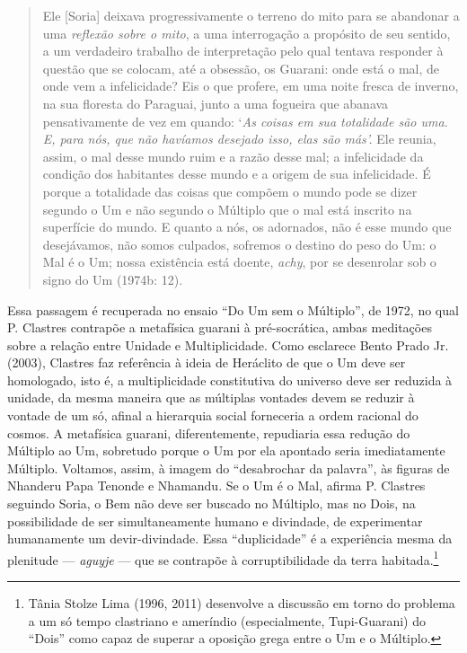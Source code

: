 \begin{quote}
Ele {[}Soria{]} deixava progressivamente o terreno do mito para se
abandonar a uma \emph{reflexão sobre o mito}, a uma interrogação a
propósito de seu sentido, a um verdadeiro trabalho de interpretação pelo
qual tentava responder à questão que se colocam, até a obsessão, os
Guarani: onde está o mal, de onde vem a infelicidade? Eis o que profere,
em uma noite fresca de inverno, na sua floresta do Paraguai, junto a uma
fogueira que abanava pensativamente de vez em quando: `\emph{As coisas
em sua totalidade são uma. E, para nós, que não havíamos desejado isso,
elas são más'.} Ele reunia, assim, o mal desse mundo ruim e a razão
desse mal; a infelicidade da condição dos habitantes desse mundo e a
origem de sua infelicidade. É porque a totalidade das coisas que compõem
o mundo pode se dizer segundo o Um e não segundo o Múltiplo que o mal
está inscrito na superfície do mundo. E quanto a nós, os adornados, não
é esse mundo que desejávamos, não somos culpados, sofremos o destino do
peso do Um: o Mal é o Um; nossa existência está doente, \emph{achy}, por
se desenrolar sob o signo do Um (1974b: 12).
\end{quote}

Essa passagem é recuperada no ensaio ``Do Um sem o Múltiplo'', de 1972,
no qual P. Clastres contrapõe a metafísica guarani à pré-socrática,
ambas meditações sobre a relação entre Unidade e Multiplicidade. Como
esclarece Bento Prado Jr. (2003), Clastres faz referência à ideia de
Heráclito de que o Um deve ser homologado, isto é, a multiplicidade
constitutiva do universo deve ser reduzida à unidade, da mesma maneira
que as múltiplas vontades devem se reduzir à vontade de um só, afinal a
hierarquia social forneceria a ordem racional do cosmos. A metafísica
guarani, diferentemente, repudiaria essa redução do Múltiplo ao Um,
sobretudo porque o Um por ela apontado seria imediatamente Múltiplo.
Voltamos, assim, à imagem do ``desabrochar da palavra'', às figuras de
Nhanderu Papa Tenonde e Nhamandu. Se o Um é o Mal, afirma P. Clastres
seguindo Soria, o Bem não deve ser buscado no Múltiplo, mas no Dois, na
possibilidade de ser simultaneamente humano e divindade, de experimentar
humanamente um devir-divindade. Essa ``duplicidade'' é a experiência
mesma da plenitude --- \emph{aguyje} --- que se contrapõe à
corruptibilidade da terra habitada.\footnote{Tânia Stolze Lima (1996,
  2011) desenvolve a discussão em torno do problema a um só tempo
  clastriano e ameríndio (especialmente, Tupi-Guarani) do ``Dois'' como
  capaz de superar a oposição grega entre o Um e o Múltiplo.}

